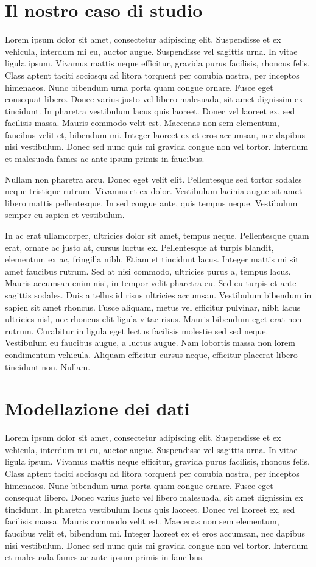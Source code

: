 \section{Il nostro caso di studio}
Lorem ipsum dolor sit amet, consectetur adipiscing elit. Suspendisse et ex vehicula, interdum mi eu, auctor augue. Suspendisse vel sagittis urna. In vitae ligula ipsum. Vivamus mattis neque efficitur, gravida purus facilisis, rhoncus felis. Class aptent taciti sociosqu ad litora torquent per conubia nostra, per inceptos himenaeos. Nunc bibendum urna porta quam congue ornare. Fusce eget consequat libero. Donec varius justo vel libero malesuada, sit amet dignissim ex tincidunt. In pharetra vestibulum lacus quis laoreet. Donec vel laoreet ex, sed facilisis massa. Mauris commodo velit est. Maecenas non sem elementum, faucibus velit et, bibendum mi. Integer laoreet ex et eros accumsan, nec dapibus nisi vestibulum. Donec sed nunc quis mi gravida congue non vel tortor. Interdum et malesuada fames ac ante ipsum primis in faucibus.

Nullam non pharetra arcu. Donec eget velit elit. Pellentesque sed tortor sodales neque tristique rutrum. Vivamus et ex dolor. Vestibulum lacinia augue sit amet libero mattis pellentesque. In sed congue ante, quis tempus neque. Vestibulum semper eu sapien et vestibulum.

In ac erat ullamcorper, ultricies dolor sit amet, tempus neque. Pellentesque quam erat, ornare ac justo at, cursus luctus ex. Pellentesque at turpis blandit, elementum ex ac, fringilla nibh. Etiam et tincidunt lacus. Integer mattis mi sit amet faucibus rutrum. Sed at nisi commodo, ultricies purus a, tempus lacus. Mauris accumsan enim nisi, in tempor velit pharetra eu. Sed eu turpis et ante sagittis sodales. Duis a tellus id risus ultricies accumsan. Vestibulum bibendum in sapien sit amet rhoncus. Fusce aliquam, metus vel efficitur pulvinar, nibh lacus ultricies nisl, nec rhoncus elit ligula vitae risus. Mauris bibendum eget erat non rutrum. Curabitur in ligula eget lectus facilisis molestie sed sed neque. Vestibulum eu faucibus augue, a luctus augue. Nam lobortis massa non lorem condimentum vehicula. Aliquam efficitur cursus neque, efficitur placerat libero tincidunt non. Nullam.


\section{Modellazione dei dati}
Lorem ipsum dolor sit amet, consectetur adipiscing elit. Suspendisse et ex vehicula, interdum mi eu, auctor augue. Suspendisse vel sagittis urna. In vitae ligula ipsum. Vivamus mattis neque efficitur, gravida purus facilisis, rhoncus felis. Class aptent taciti sociosqu ad litora torquent per conubia nostra, per inceptos himenaeos. Nunc bibendum urna porta quam congue ornare. Fusce eget consequat libero. Donec varius justo vel libero malesuada, sit amet dignissim ex tincidunt. In pharetra vestibulum lacus quis laoreet. Donec vel laoreet ex, sed facilisis massa. Mauris commodo velit est. Maecenas non sem elementum, faucibus velit et, bibendum mi. Integer laoreet ex et eros accumsan, nec dapibus nisi vestibulum. Donec sed nunc quis mi gravida congue non vel tortor. Interdum et malesuada fames ac ante ipsum primis in faucibus.

